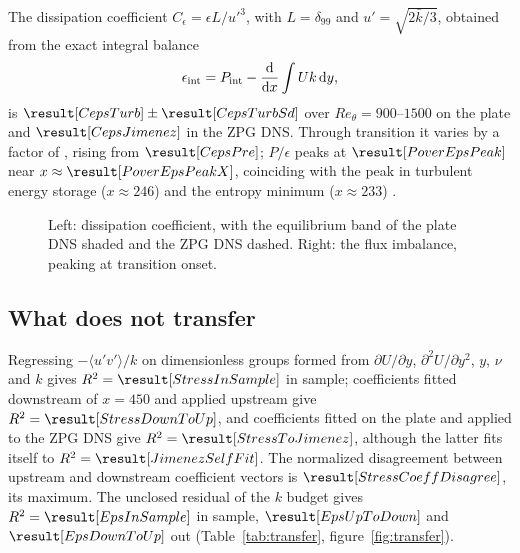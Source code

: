 \documentclass[lineno]{jfm}
\begin{document}
The dissipation coefficient $C_\epsilon = \epsilon L / u'^3$, with
$L = \delta_{99}$ and $u' = \sqrt{2\bar{k}/3}$, obtained from the exact
integral balance
\begin{equation}
  \epsilon_{\rm int} = P_{\rm int} - \frac{{\rm d}}{{\rm d}x}
  \int U k \, {\rm d}y ,
  \label{eq:intbudget}
\end{equation}
is $\result[CepsTurb] \pm \result[CepsTurbSd]$ over $Re_\theta = 900$--$1500$
on the plate and $\result[CepsJimenez]$ in the ZPG DNS. Through transition
it varies by a factor of \result[CepsRatio], rising from $\result[CepsPre]$;
$P/\epsilon$ peaks at $\result[PoverEpsPeak]$ near
$x \approx \result[PoverEpsPeakX]$, coinciding with the peak in turbulent
energy storage ($x \approx 246$) and the entropy minimum ($x \approx 233$)
\citep[cf.][]{Vassilicos2015, LiuFangFang2021}.

\begin{figure}
  \centerline{}
  \caption{Left: dissipation coefficient, with the equilibrium band of the
    plate DNS shaded and the ZPG DNS dashed. Right: the flux imbalance,
    peaking at transition onset.}
  \label{fig:dissipation}
\end{figure}

\subsection{What does not transfer}\label{sec:fails}

Regressing $-\langle u'v'\rangle/k$ on \result[NTerms] dimensionless groups
formed from $\partial U/\partial y$, $\partial^2 U/\partial y^2$, $y$, $\nu$
and $k$ gives $R^2 = \result[StressInSample]$ in sample; coefficients fitted
downstream of $x = 450$ and applied upstream give
$R^2 = \result[StressDownToUp]$, and coefficients fitted on the plate and
applied to the ZPG DNS give $R^2 = \result[StressToJimenez]$, although the
latter fits itself to $R^2 = \result[JimenezSelfFit]$. The normalized
disagreement between upstream and downstream coefficient vectors is
$\result[StressCoeffDisagree]$, its maximum. The unclosed residual of the
$k$ budget gives $R^2 = \result[EpsInSample]$ in sample, $\result[EpsUpToDown]$
and $\result[EpsDownToUp]$ out (Table~\ref{tab:transfer},
figure~\ref{fig:transfer}).
\end{document}
